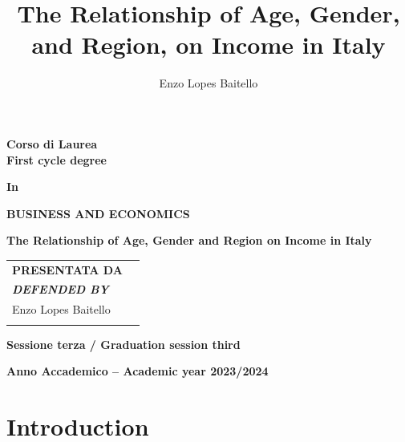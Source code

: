 \documentclass[12pt]{article}
\title{The Relationship of Age, Gender, and Region, on Income in Italy}
\author{Enzo Lopes Baitello}
\begin{document}
\begin{spacing}{2}

{
\centering
{}
}



\bigskip

\begin{spacing}{1.25}
\textbf{\small Corso di Laurea\\
First cycle degree}
\end{spacing}

\textbf{\small In}

\textbf{BUSINESS AND ECONOMICS}

\bigskip

\begin{spacing}{1.5}

\textbf{\Large The Relationship of Age, Gender and Region on Income in Italy}
\end{spacing}

\bigskip
\bigskip
\bigskip

\begin{longtable}[]{@{}
  >{\raggedright\arraybackslash}p{}
  >{\raggedright\arraybackslash}p{}@{}}
\endhead
\endlastfoot
\textbf{ PRESENTATA DA } & \\
\textbf{  \emph{DEFENDED BY}} & \\
 Enzo Lopes Baitello & \\
 0001005059 & \\
\end{longtable}

\vfill

\textbf{Sessione terza / Graduation session
third}

\clearpage

\textbf{Anno Accademico -- Academic year 2023/2024}

\end{spacing}

\clearpage
\tableofcontents

\clearpage
\section{Introduction}
\end{document}

